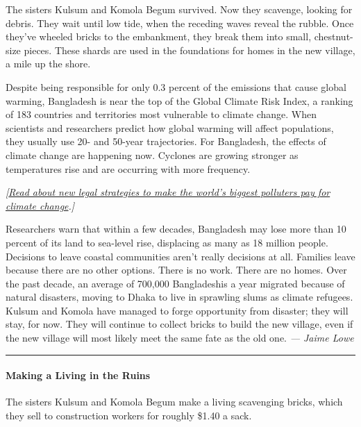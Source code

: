 The sisters Kulsum and Komola Begum survived. Now they scavenge, looking
for debris. They wait until low tide, when the receding waves reveal the
rubble. Once they've wheeled bricks to the embankment, they break them
into small, chestnut-size pieces. These shards are used in the
foundations for homes in the new village, a mile up the shore.

Despite being responsible for only 0.3 percent of the emissions that
cause global warming, Bangladesh is near the top of the Global Climate
Risk Index, a ranking of 183 countries and territories most vulnerable
to climate change. When scientists and researchers predict how global
warming will affect populations, they usually use 20- and 50-year
trajectories. For Bangladesh, the effects of climate change are
happening now. Cyclones are growing stronger as temperatures rise and
are occurring with more frequency.

\emph{{[}\href{https://www.nytimes.com/interactive/2019/04/09/magazine/climate-change-peru-law.html}{Read
about new legal strategies to make the world's biggest polluters pay for
climate change}.{]}}

Researchers warn that within a few decades, Bangladesh may lose more
than 10 percent of its land to sea-level rise, displacing as many as 18
million people. Decisions to leave coastal communities aren't really
decisions at all. Families leave because there are no other options.
There is no work. There are no homes. Over the past decade, an average
of 700,000 Bangladeshis a year migrated because of natural disasters,
moving to Dhaka to live in sprawling slums as climate refugees. Kulsum
and Komola have managed to forge opportunity from disaster; they will
stay, for now. They will continue to collect bricks to build the new
village, even if the new village will most likely meet the same fate as
the old one. \emph{--- Jaime Lowe}

\begin{center}\rule{0.5\linewidth}{\linethickness}\end{center}

\hypertarget{making-a-living-in-the-ruins}{%
\paragraph{Making a Living in the
Ruins}\label{making-a-living-in-the-ruins}}

The sisters Kulsum and Komola Begum make a living scavenging bricks,
which they sell to construction workers for roughly \$1.40 a sack.

